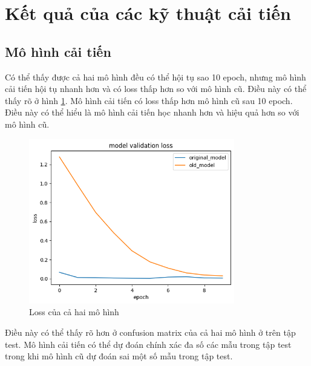\section{Kết quả của các kỹ thuật cải tiến}
\subsection{Mô hình cải tiến}
Có thể thấy được cả hai mô hình đều có thể hội tụ sao 10 epoch, nhưng mô hình cải tiến hội tụ nhanh hơn và có loss thấp hơn so với mô hình cũ. Điều này có thể thấy rõ ở hình \ref{fig:loss_model}. Mô hình cải tiến có loss thấp hơn mô hình cũ sau 10 epoch. Điều này có thể hiểu là mô hình cải tiến học nhanh hơn và hiệu quả hơn so với mô hình cũ.

\begin{figure}[H]
    \centering
    \includegraphics[width=0.8\textwidth]{Images/Improvement results/old_new_loss.png}
    \caption{Loss của cả hai mô hình }
    \label{fig:loss_model}
\end{figure}

Điều này có thể thấy rõ hơn ở confusion matrix của cả hai mô hình ở trên tập test. Mô hình cải tiến có thể dự đoán chính xác đa số các mẫu trong tập test trong khi mô hình cũ dự đoán sai một số mẫu trong tập test.

